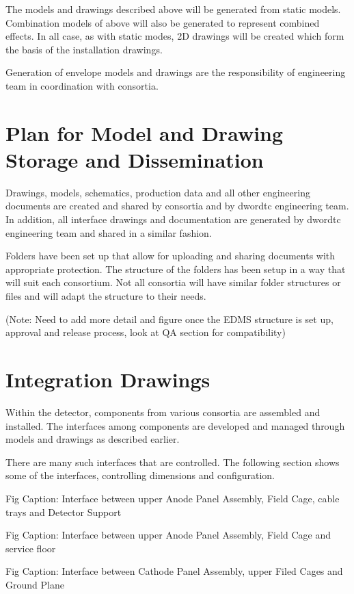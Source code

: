 The models and drawings described above will be generated from static
models. Combination models of above will also be generated to
represent combined effects. In all case, as with static modes, 2D
drawings will be created which form the basis of the installation
drawings.

Generation of envelope models and drawings are the responsibility of
 engineering team in coordination with consortia.


\section{Plan for Model and Drawing Storage and Dissemination}
\label{sec:fdsp-coord-integ-modelplan}
Drawings, models, schematics, production data and all other
engineering documents are created and shared by consortia and by
dword{tc} engineering team. In addition, all interface drawings and
documentation are generated by dword{tc} engineering team and shared
in a similar fashion.

Folders have been set up that allow for uploading and sharing
documents with appropriate protection. The structure of the folders
has been setup in a way that will suit each consortium. Not all
consortia will have similar folder structures or files and will adapt
the structure to their needs.

(Note: Need to add more detail and figure once the EDMS structure is
set up, approval and release process, look at QA section for
compatibility)

\section{Integration Drawings}
\label{sec:fdsp-coord-integ-drawings}
Within the detector, components from various consortia are assembled
and installed. The interfaces among components are developed and
managed through models and drawings as described earlier.

There are many such interfaces that are controlled. The following
section shows some of the interfaces, controlling dimensions and
configuration.

Fig
Caption: Interface between upper Anode Panel Assembly, Field Cage, cable trays and Detector Support

Fig
Caption: Interface between upper Anode Panel Assembly, Field Cage and service floor

Fig
Caption: Interface between Cathode Panel Assembly, upper Filed Cages and Ground Plane

